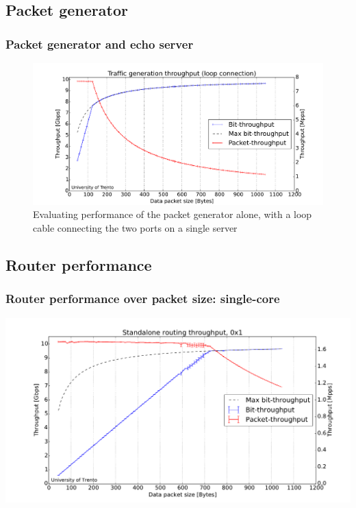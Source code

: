 \subsection{Packet generator}
\begin{frame}[fragile]
  \frametitle{Packet generator and echo server}

  \begin{figure}
    \includegraphics[height=.65\textheight]{img/gen_loop_increasing_len.pdf}
    \caption{Evaluating performance of the packet generator alone, with a loop cable connecting the two ports on a single server}
  \end{figure}
\end{frame}


\subsection{Router performance}

\begin{frame}[fragile]
  \frametitle{Router performance over packet size: single-core}
  
  \includegraphics[width=\textwidth]{img/augustus_increasing_len_0x1.pdf}
\end{frame}


